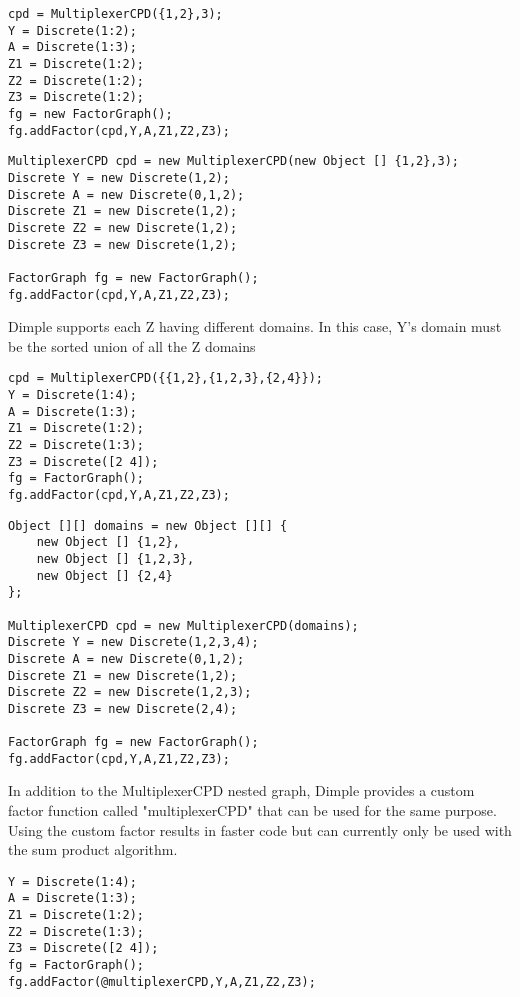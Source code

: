 \ifmatlab
\begin{lstlisting}
cpd = MultiplexerCPD({1,2},3);
Y = Discrete(1:2);
A = Discrete(1:3);
Z1 = Discrete(1:2);
Z2 = Discrete(1:2);
Z3 = Discrete(1:2);
fg = new FactorGraph();
fg.addFactor(cpd,Y,A,Z1,Z2,Z3);
\end{lstlisting}
\fi


\ifjava
\begin{lstlisting}
MultiplexerCPD cpd = new MultiplexerCPD(new Object [] {1,2},3);
Discrete Y = new Discrete(1,2);
Discrete A = new Discrete(0,1,2);
Discrete Z1 = new Discrete(1,2);
Discrete Z2 = new Discrete(1,2);
Discrete Z3 = new Discrete(1,2);

FactorGraph fg = new FactorGraph();
fg.addFactor(cpd,Y,A,Z1,Z2,Z3);
\end{lstlisting}
\fi

Dimple supports each Z having different domains.  In this case, Y's domain must be the sorted union of all the Z domains

\ifmatlab
\begin{lstlisting}
cpd = MultiplexerCPD({{1,2},{1,2,3},{2,4}});
Y = Discrete(1:4);
A = Discrete(1:3);
Z1 = Discrete(1:2);
Z2 = Discrete(1:3);
Z3 = Discrete([2 4]);
fg = FactorGraph();
fg.addFactor(cpd,Y,A,Z1,Z2,Z3);
\end{lstlisting}
\fi

\ifjava
\begin{lstlisting}
Object [][] domains = new Object [][] {
	new Object [] {1,2},
	new Object [] {1,2,3},
	new Object [] {2,4}
};

MultiplexerCPD cpd = new MultiplexerCPD(domains);
Discrete Y = new Discrete(1,2,3,4);
Discrete A = new Discrete(0,1,2);
Discrete Z1 = new Discrete(1,2);
Discrete Z2 = new Discrete(1,2,3);
Discrete Z3 = new Discrete(2,4);

FactorGraph fg = new FactorGraph();
fg.addFactor(cpd,Y,A,Z1,Z2,Z3);
\end{lstlisting}
\fi

In addition to the MultiplexerCPD nested graph, Dimple provides a custom factor function called "multiplexerCPD" that can be used for the same purpose.  Using the custom factor results in faster code but can currently only be used with the sum product algorithm.  

\ifmatlab
\begin{lstlisting}
Y = Discrete(1:4);
A = Discrete(1:3);
Z1 = Discrete(1:2);
Z2 = Discrete(1:3);
Z3 = Discrete([2 4]);
fg = FactorGraph();
fg.addFactor(@multiplexerCPD,Y,A,Z1,Z2,Z3);
\end{lstlisting}
\fi

